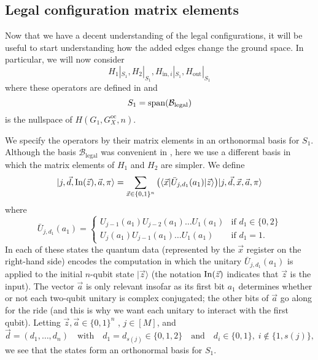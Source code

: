 \documentclass[../thesis-main/thesis-main]{subfiles}
\begin{document}
\subsection{Legal configuration matrix elements}\label{sec:legal_config_matrix_elements}

Now that we have a decent understanding of the legal configurations, it will be useful to start understanding how the added edges change the ground space.  In particular, we will now consider
\begin{equation}
H_{1}|_{S_{1}},H_{2}|_{S_{1}},H_{\text{in},i}|_{S_{1}},H_{\text{out}}|_{S_{1}}\label{eq:ops_restriction_S1}
\end{equation}
where these operators are defined in  and 
\begin{equation}
S_{1}=\operatorname{span}(\mathcal{B}_{\text{legal}})
\end{equation}
is the nullspace of $H(G_1,G_X^{\text{oc}},n)$.

We specify the operators  by their matrix elements in an orthonormal basis for $S_{1}$. Although the basis $\mathcal{B}_{\text{legal}}$ was convenient in , here we use a different basis in which the matrix elements of $H_{1}$ and $H_{2}$ are simpler. We define
\begin{equation}
  |j,\vec{d},\operatorname{In}(\vec{z}),\vec{a},\pi\rangle
  =\sum_{\vec{x}\in\{0,1\}^{n}} \big(\langle\vec{x} 
   |\bar{U}_{j,d_1}(a_{1}) 
   |\vec{z}\rangle\big)|j,\vec{d},\vec{x},\vec{a},\pi\rangle 
  \label{eq:phi_init_basis}
\end{equation}
where
\begin{equation}
  \bar{U}_{j,d_1}(a_1) = \begin{cases}
    U_{j-1}(a_1) U_{j-2}(a_1) \ldots U_1(a_1) & \text{if $d_1 \in \{0,2\}$} \\
    U_j(a_1) U_{j-1}(a_1) \ldots U_1(a_1) & \text{if $d_1=1$}.
  \end{cases}
  \label{eq:ubar}
\end{equation}
In each of these states the quantum data (represented by the $\vec{x}$ register on the right-hand side) encodes the computation in which the unitary $\bar{U}_{j,d_1}(a_1)$ is applied to the initial $n$-qubit state $|\vec{z}\rangle$ (the notation $\operatorname{In}(\vec{z})$ indicates that $\vec{z}$ is the input). The vector $\vec{a}$ is only relevant insofar as its first bit $a_{1}$ determines whether or not each two-qubit unitary is complex conjugated; the other bits of $\vec{a}$ go along for the ride (and this is why we want each unitary to interact with the first qubit). Letting $\vec{z},\vec{a}\in\{0,1\}^{n}$ , $j\in[M]$, and \begin{equation} \vec{d}=(d_{1},\ldots,d_{n})\quad\text{with}\quad d_{1}=d_{s(j)}\in\{0,1,2\}\quad\text{and}\quad d_{i}\in\{0,1\},\; i\notin\{1,s(j)\}, \end{equation} we see that the states  form an orthonormal basis for $S_{1}$.
\end{document}
